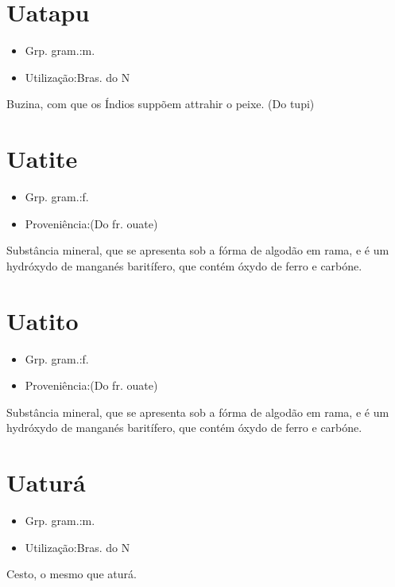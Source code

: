 \documentclass{article}
\begin{document}
\section{Uatapu}
\begin{itemize}
\item {Grp. gram.:m.}
\end{itemize}
\begin{itemize}
\item {Utilização:Bras. do N}
\end{itemize}
Buzina, com que os Índios suppõem attrahir o peixe.
(Do tupi)
\section{Uatite}
\begin{itemize}
\item {Grp. gram.:f.}
\end{itemize}
\begin{itemize}
\item {Proveniência:(Do fr. \textunderscore ouate\textunderscore )}
\end{itemize}
Substância mineral, que se apresenta sob a fórma de algodão em rama, e é um hydróxydo de manganés baritífero, que contém óxydo de ferro e carbóne.
\section{Uatito}
\begin{itemize}
\item {Grp. gram.:f.}
\end{itemize}
\begin{itemize}
\item {Proveniência:(Do fr. \textunderscore ouate\textunderscore )}
\end{itemize}
Substância mineral, que se apresenta sob a fórma de algodão em rama, e é um hydróxydo de manganés baritífero, que contém óxydo de ferro e carbóne.
\section{Uaturá}
\begin{itemize}
\item {Grp. gram.:m.}
\end{itemize}
\begin{itemize}
\item {Utilização:Bras. do N}
\end{itemize}
Cesto, o mesmo que \textunderscore aturá\textunderscore .
\end{document}
